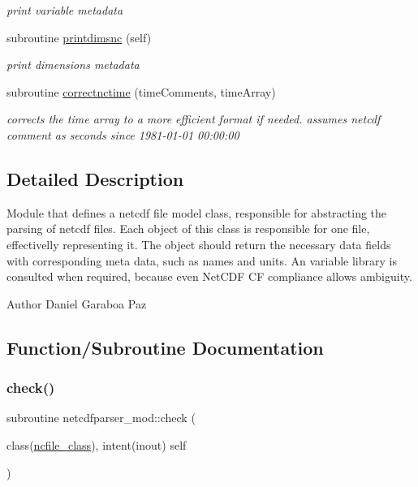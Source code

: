 \begin{DoxyCompactItemize}
\begin{DoxyCompactList}\small\item\em print variable metadata \end{DoxyCompactList}\item 
subroutine \mbox{\hyperlink{namespacenetcdfparser__mod_ac01c000a97d23613684155708249ce89}{printdimsnc}} (self)
\begin{DoxyCompactList}\small\item\em print dimensions metadata \end{DoxyCompactList}\item 
subroutine \mbox{\hyperlink{namespacenetcdfparser__mod_af93319fde6cf6baedb7fe27bf3396e7b}{correctnctime}} (time\+Comments, time\+Array)
\begin{DoxyCompactList}\small\item\em corrects the time array to a more efficient format if needed. assumes netcdf comment as \textquotesingle{}seconds since 1981-\/01-\/01 00\+:00\+:00\textquotesingle{} \end{DoxyCompactList}\end{DoxyCompactItemize}


\subsection{Detailed Description}
Module that defines a netcdf file model class, responsible for abstracting the parsing of netcdf files. Each object of this class is responsible for one file, effectivelly representing it. The object should return the necessary data fields with corresponding meta data, such as names and units. An variable library is consulted when required, because even Net\+C\+DF CF compliance allows ambiguity. 

\begin{DoxyAuthor}{Author}
Daniel Garaboa Paz 
\end{DoxyAuthor}


\subsection{Function/\+Subroutine Documentation}
\mbox{\label{namespacenetcdfparser__mod_ae1a034f6540ac7a1ce7d0e3831bb2f03}} 
\subsubsection{\texorpdfstring{check()}{check()}}
{\footnotesize\ttfamily subroutine netcdfparser\+\_\+mod\+::check (\begin{DoxyParamCaption}\item[{class(\mbox{\hyperlink{structnetcdfparser__mod_1_1ncfile__class}{ncfile\+\_\+class}}), intent(inout)}]{self }\end{DoxyParamCaption})\hspace{0.3cm}{\ttfamily [private]}}



